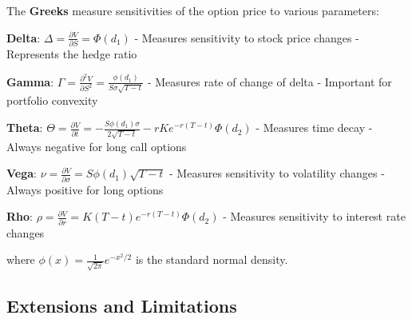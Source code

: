 \documentclass[
  letterpaper,
  DIV=11,
  numbers=noendperiod]{scrartcl}
\begin{document}
\begin{tcolorbox}[enhanced jigsaw, colback=white, rightrule=.15mm, coltitle=black, left=2mm, colframe=quarto-callout-note-color-frame, breakable, arc=.35mm, bottomtitle=1mm, toptitle=1mm, titlerule=0mm, leftrule=.75mm, colbacktitle=quarto-callout-note-color!10!white, title={Definition 5.1 (The Greeks)}, toprule=.15mm, opacitybacktitle=0.6, bottomrule=.15mm, opacityback=0]

The \textbf{Greeks} measure sensitivities of the option price to various
parameters:

\textbf{Delta}: \(\Delta = \frac{\partial V}{\partial S} = \Phi(d_1)\) -
Measures sensitivity to stock price changes - Represents the hedge ratio

\textbf{Gamma}:
\(\Gamma = \frac{\partial^2 V}{\partial S^2} = \frac{\phi(d_1)}{S\sigma\sqrt{T-t}}\)
- Measures rate of change of delta - Important for portfolio convexity

\textbf{Theta}:
\(\Theta = \frac{\partial V}{\partial t} = -\frac{S\phi(d_1)\sigma}{2\sqrt{T-t}} - rKe^{-r(T-t)}\Phi(d_2)\)
- Measures time decay - Always negative for long call options

\textbf{Vega}:
\(\nu = \frac{\partial V}{\partial \sigma} = S\phi(d_1)\sqrt{T-t}\) -
Measures sensitivity to volatility changes - Always positive for long
options

\textbf{Rho}:
\(\rho = \frac{\partial V}{\partial r} = K(T-t)e^{-r(T-t)}\Phi(d_2)\) -
Measures sensitivity to interest rate changes

where \(\phi(x) = \frac{1}{\sqrt{2\pi}}e^{-x^2/2}\) is the standard
normal density.

\end{tcolorbox}

\hypertarget{extensions-and-limitations}{%
\subsection{Extensions and
Limitations}\label{extensions-and-limitations}}
\end{document}
